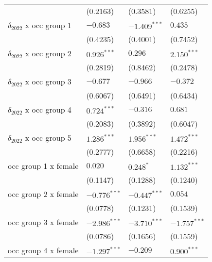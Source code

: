 \begin{tabular}{llll}
                                       &           (0.2163) &           (0.3581) &           (0.6255) \\
$\delta_{2022}$ x occ group 1          &           $-0.683$ &     $-1.409^{***}$ &            $0.435$ \\
                                       &           (0.4235) &           (0.4001) &           (0.7452) \\
$\delta_{2022}$ x occ group 2          &      $0.926^{***}$ &            $0.296$ &      $2.150^{***}$ \\
                                       &           (0.2819) &           (0.8462) &           (0.2478) \\
$\delta_{2022}$ x occ group 3          &           $-0.677$ &           $-0.966$ &           $-0.372$ \\
                                       &           (0.6067) &           (0.6491) &           (0.6434) \\
$\delta_{2022}$ x occ group 4          &      $0.724^{***}$ &           $-0.316$ &            $0.681$ \\
                                       &           (0.2083) &           (0.3892) &           (0.6047) \\
$\delta_{2022}$ x occ group 5          &      $1.286^{***}$ &      $1.956^{***}$ &      $1.472^{***}$ \\
                                       &           (0.2777) &           (0.6658) &           (0.2216) \\
occ group 1 x female                   &            $0.020$ &          $0.248^*$ &      $1.132^{***}$ \\
                                       &           (0.1147) &           (0.1288) &           (0.1240) \\
occ group 2 x female                   &     $-0.776^{***}$ &     $-0.447^{***}$ &            $0.054$ \\
                                       &           (0.0778) &           (0.1231) &           (0.1539) \\
occ group 3 x female                   &     $-2.986^{***}$ &     $-3.710^{***}$ &     $-1.757^{***}$ \\
                                       &           (0.0786) &           (0.1656) &           (0.1559) \\
occ group 4 x female                   &     $-1.297^{***}$ &           $-0.209$ &      $0.900^{***}$ \\

\end{tabular}
